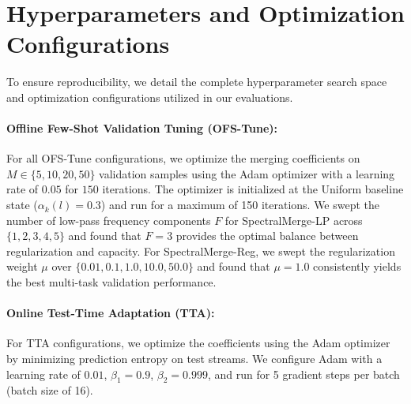 \documentclass{article}
\theoremstyle{plain}
\theoremstyle{definition}
\theoremstyle{remark}
\begin{document}










\newpage
\appendix
\onecolumn
\section{Hyperparameters and Optimization Configurations}
\label{app:hyperparams}

To ensure reproducibility, we detail the complete hyperparameter search space and optimization configurations utilized in our evaluations.

\paragraph{Offline Few-Shot Validation Tuning (OFS-Tune):}
For all OFS-Tune configurations, we optimize the merging coefficients on $M \in \{5, 10, 20, 50\}$ validation samples using the Adam optimizer with a learning rate of $0.05$ for $150$ iterations. The optimizer is initialized at the Uniform baseline state ($\alpha_k(l) = 0.3$) and run for a maximum of 150 iterations. We swept the number of low-pass frequency components $F$ for SpectralMerge-LP across $\{1, 2, 3, 4, 5\}$ and found that $F=3$ provides the optimal balance between regularization and capacity. For SpectralMerge-Reg, we swept the regularization weight $\mu$ over $\{0.01, 0.1, 1.0, 10.0, 50.0\}$ and found that $\mu=1.0$ consistently yields the best multi-task validation performance.

\paragraph{Online Test-Time Adaptation (TTA):}
For TTA configurations, we optimize the coefficients using the Adam optimizer by minimizing prediction entropy on test streams. We configure Adam with a learning rate of $0.01$, $\beta_1 = 0.9$, $\beta_2 = 0.999$, and run for 5 gradient steps per batch (batch size of 16).
\end{document}
